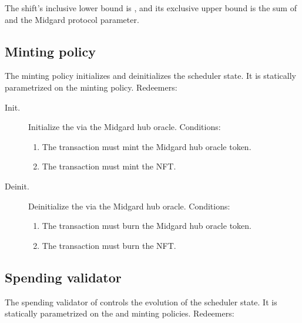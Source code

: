 \documentclass[../midgard.tex]{subfiles}
\begin{document}
The shift's inclusive lower bound is , and its exclusive upper bound is the sum of  and the  Midgard protocol parameter.

\subsection{Minting policy}
\label{h:scheduler-minting-policy}

The  minting policy initializes and deinitializes the scheduler state.
It is statically parametrized on the  minting policy.
Redeemers:

\begin{description}
    \item[Init.] Initialize the  via the Midgard hub oracle.
      Conditions:
        \begin{enumerate}
            \item The transaction must mint the Midgard hub oracle token.
            \item The transaction must mint the  NFT.
        \end{enumerate}

    \item[Deinit.] Deinitialize the  via the Midgard hub oracle.
      Conditions:
        \begin{enumerate}
            \item The transaction must burn the Midgard hub oracle token.
            \item The transaction must burn the  NFT.
        \end{enumerate}
\end{description}

\subsection{Spending validator}
\label{h:scheduler-spending-validator}

The spending validator of  controls the evolution of the scheduler state.
It is statically parametrized on the  and  minting policies.
Redeemers:
\end{document}
